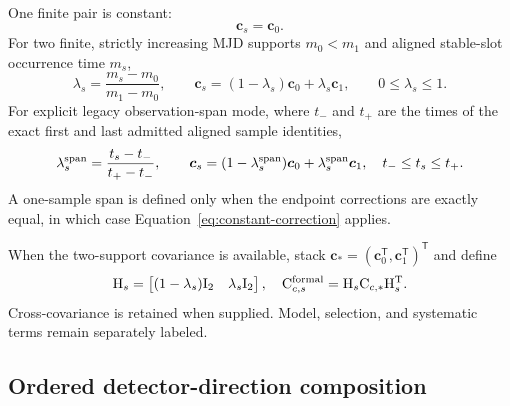 One finite pair is constant:
\begin{equation}
 \boldsymbol c_s=\boldsymbol c_0.
 \label{eq:constant-correction}
\end{equation}
For two finite, strictly increasing MJD supports $m_0<m_1$ and aligned
stable-slot occurrence time $m_s$,
\begin{equation}
 \lambda_s=\frac{m_s-m_0}{m_1-m_0},\qquad
 \boldsymbol c_s=(1-\lambda_s)\boldsymbol c_0+
                  \lambda_s\boldsymbol c_1,
 \qquad 0\leq\lambda_s\leq1.
 \label{eq:mjd-correction}
\end{equation}
For explicit legacy observation-span mode, where $t_-$ and $t_+$ are the
times of the exact first and last admitted aligned sample identities,
\begin{equation}
 \lambda_s^{\rm span}=\frac{t_s-t_-}{t_+-t_-},\qquad
 \boldsymbol c_s=(1-\lambda_s^{\rm span})\boldsymbol c_0+
                  \lambda_s^{\rm span}\boldsymbol c_1,
 \quad t_-\leq t_s\leq t_+.
 \label{eq:span-correction}
\end{equation}
A one-sample span is defined only when the endpoint corrections are exactly
equal, in which case Equation~\ref{eq:constant-correction} applies.

When the two-support covariance is available, stack
$\boldsymbol c_*=(\boldsymbol c_0^\mathsf T,
\boldsymbol c_1^\mathsf T)^\mathsf T$ and define
\begin{equation}
 \mathsf H_s=
 \begin{bmatrix}(1-\lambda_s)\mathsf I_2&\lambda_s\mathsf I_2\end{bmatrix},
 \quad
 \mathsf C_{c,s}^{\rm formal}=
 \mathsf H_s\mathsf C_{c,*}\mathsf H_s^\mathsf T.
 \label{eq:support-covariance}
\end{equation}
Cross-covariance is retained when supplied.  Model, selection, and systematic
terms remain separately labeled.

\subsection{Ordered detector-direction composition}

